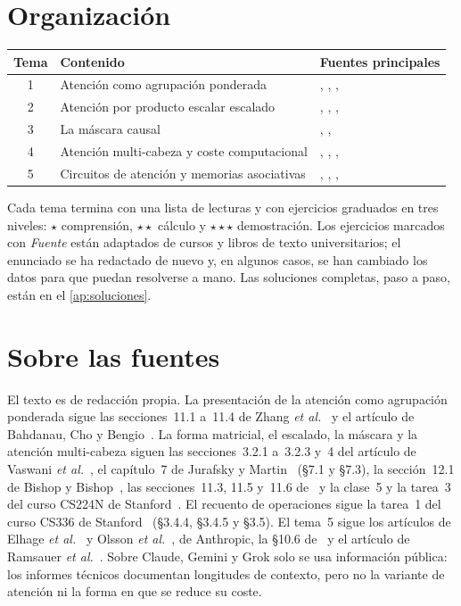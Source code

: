 \documentclass[11pt,a4paper,twoside,openany]{book}
\begin{document}
\section*{Organización}
\begin{center}
\begin{tabular}{@{}cll@{}}
\toprule
Tema & Contenido & Fuentes principales \\
\midrule
1 & Atención como agrupación ponderada & \cite{d2l}, \cite{bahdanau}, \cite{jm3}, \cite{cs224n} \\
2 & Atención por producto escalar escalado & \cite{vaswani}, \cite{jm3}, \cite{d2l}, \cite{bishopdl} \\
3 & La máscara causal & \cite{vaswani}, \cite{jm3}, \cite{cs336} \\
4 & Atención multi-cabeza y coste computacional & \cite{vaswani}, \cite{cs336}, \cite{d2l}, \cite{jm3} \\
5 & Circuitos de atención y memorias asociativas & \cite{elhage}, \cite{olsson}, \cite{ramsauer}, \cite{d2l} \\
\bottomrule
\end{tabular}
\end{center}

Cada tema termina con una lista de lecturas y con ejercicios graduados en tres niveles: $\star$ comprensión, $\star\star$ cálculo y $\star\star\star$ demostración. Los ejercicios marcados con \emph{Fuente} están adaptados de cursos y libros de texto universitarios; el enunciado se ha redactado de nuevo y, en algunos casos, se han cambiado los datos para que puedan resolverse a mano. Las soluciones completas, paso a paso, están en el \cref{ap:soluciones}.

\section*{Sobre las fuentes}
El texto es de redacción propia. La presentación de la atención como agrupación ponderada sigue las secciones~11.1 a~11.4 de Zhang \emph{et al.}~\cite{d2l} y el artículo de Bahdanau, Cho y Bengio~\cite{bahdanau}. La forma matricial, el escalado, la máscara y la atención multi-cabeza siguen las secciones~3.2.1 a~3.2.3 y~4 del artículo de Vaswani \emph{et al.}~\cite{vaswani}, el capítulo~7 de Jurafsky y Martin~\cite{jm3} (§7.1 y §7.3), la sección~12.1 de Bishop y Bishop~\cite{bishopdl}, las secciones~11.3, 11.5 y~11.6 de~\cite{d2l} y la clase~5 y la tarea~3 del curso CS224N de Stanford~\cite{cs224n}. El recuento de operaciones sigue la tarea~1 del curso CS336 de Stanford~\cite{cs336} (§3.4.4, §3.4.5 y §3.5). El tema~5 sigue los artículos de Elhage \emph{et al.}~\cite{elhage} y Olsson \emph{et al.}~\cite{olsson}, de Anthropic, la §10.6 de~\cite{jm3} y el artículo de Ramsauer \emph{et al.}~\cite{ramsauer}. Sobre Claude, Gemini y Grok solo se usa información pública: los informes técnicos documentan longitudes de contexto, pero no la variante de atención ni la forma en que se reduce su coste.
\end{document}
